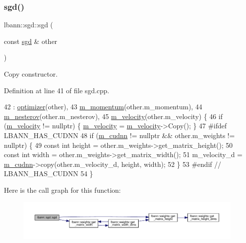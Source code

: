 \subsubsection{\texorpdfstring{sgd()}{sgd()}\hspace{0.1cm}{\footnotesize\ttfamily [2/2]}}
{\footnotesize\ttfamily lbann\+::sgd\+::sgd (\begin{DoxyParamCaption}\item[{const \hyperlink{classlbann_1_1sgd}{sgd} \&}]{other }\end{DoxyParamCaption})}

Copy constructor. 

Definition at line 41 of file sgd.\+cpp.


\begin{DoxyCode}
42   : \hyperlink{classlbann_1_1optimizer_a136ed79c3f279ecded5be380fb67b05f}{optimizer}(other),
43     \hyperlink{classlbann_1_1sgd_a2e56d66d350debcf0d2c3ad76c214074}{m\_momentum}(other.m\_momentum),
44     \hyperlink{classlbann_1_1sgd_a82da488e5d1530f50f67cd4ea30909cb}{m\_nesterov}(other.m\_nesterov),
45     \hyperlink{classlbann_1_1sgd_a27f2d893014cef8357edffb63bf649f0}{m\_velocity}(other.m\_velocity) \{
46   \textcolor{keywordflow}{if} (\hyperlink{classlbann_1_1sgd_a27f2d893014cef8357edffb63bf649f0}{m\_velocity} != \textcolor{keyword}{nullptr}) \{ \hyperlink{classlbann_1_1sgd_a27f2d893014cef8357edffb63bf649f0}{m\_velocity} = \hyperlink{classlbann_1_1sgd_a27f2d893014cef8357edffb63bf649f0}{m\_velocity}->Copy(); \}
47 \textcolor{preprocessor}{  #ifdef LBANN\_HAS\_CUDNN}
48   \textcolor{keywordflow}{if} (\hyperlink{classlbann_1_1optimizer_a2f24dbeaca18b06f4aa7d179bbf96680}{m\_cudnn} != \textcolor{keyword}{nullptr} && other.m\_weights != \textcolor{keyword}{nullptr}) \{
49     \textcolor{keyword}{const} \textcolor{keywordtype}{int} height = other.m\_weights->get\_matrix\_height();
50     \textcolor{keyword}{const} \textcolor{keywordtype}{int} width = other.m\_weights->get\_matrix\_width();
51     m\_velocity\_d = \hyperlink{classlbann_1_1optimizer_a2f24dbeaca18b06f4aa7d179bbf96680}{m\_cudnn}->copy(other.m\_velocity\_d, height, width);
52   \}
53 \textcolor{preprocessor}{  #endif // LBANN\_HAS\_CUDNN}
54 \}
\end{DoxyCode}
Here is the call graph for this function\+:\nopagebreak
\begin{figure}[H]
\begin{center}
\leavevmode
\includegraphics[width=350pt]{classlbann_1_1sgd_ac0a74200f44b45ced9b44e3b6349581a_cgraph}
\end{center}
\end{figure}
\mbox{\label{classlbann_1_1sgd_a0d0410edb1ca4510509cc9a5de105b4f}} 
